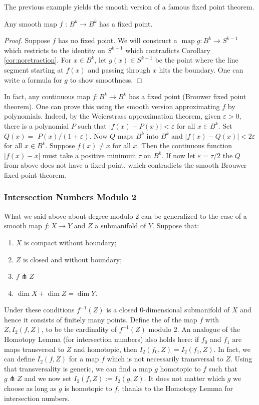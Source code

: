 \documentclass[a4paper]{scrartcl}
\begin{document}
The previous example yields the smooth version of a famous fixed point theorem.

\begin{theorem}
    Any smooth map $f$ : $B^{k} \rightarrow B^{k}$ has a fixed point.
\end{theorem}
\begin{proof}
    Suppose $f$ has no fixed point. We will construct a $\operatorname{map} g: B^{k} \rightarrow S^{k-1}$ which restricts to the identity on $S^{k-1}$ which contradicts Corollary \ref{cor:noretraction}. For $x \in B^{k}$, let $g(x) \in S^{k-1}$ be the point where the line segment starting at $f(x)$ and passing through $x$ hits the boundary. One can write a formula for $g$ to show smoothness.
\end{proof}

In fact, any continuous map $f: B^{k} \rightarrow B^{k}$ has a fixed point (Brouwer fixed point theorem). One can prove this using the smooth version approximating $f$ by polynomials. Indeed, by the Weierstrass approximation theorem, given $\varepsilon>0$, there is a polynomial $P$ such that $|f(x)-P(x)|<\varepsilon$ for all $x \in B^{k}$. Set $Q(x)=$ $P(x) /(1+\varepsilon)$. Now $Q$ maps $B^{k}$ into $B^{k}$ and $|f(x)-Q(x)|<2 \varepsilon$ for all $x \in B^{k}$. Suppose $f(x) \neq x$ for all $x$. Then the continuous function $|f(x)-x|$ must take a positive minimum $\tau$ on $B^{k}$. If now let $\varepsilon=\tau / 2$ the $Q$ from above does not have a fixed point, which contradicts the smooth Brouwer fixed point theorem.

\subsubsection{Intersection Numbers Modulo 2}

What we said above about degree modulo 2 can be generalized to the case of a smooth map $f: X \rightarrow Y$ and $Z$ a submanifold of $Y$. Suppose that:
\begin{enumerate}
    \item $X$ is compact without boundary;
    \item $Z$ is closed and without boundary;
    \item $f \pitchfork Z$
    \item $\operatorname{dim} X+\operatorname{dim} Z=\operatorname{dim} Y$.
\end{enumerate}
Under these conditions $f^{-1}(Z)$ is a closed 0-dimensional submanifold of $X$ and hence it consists of finitely many points. Define the  of the map $f$ with $Z, I_{2}(f, Z)$, to be the cardinality of $f^{-1}(Z)$ modulo 2. An analogue of the Homotopy Lemma (for intersection numbers) also holds here: if $f_{0}$ and $f_{1}$ are maps transversal to $Z$ and homotopic, then $I_{2}\left(f_{0}, Z\right)=I_{2}\left(f_{1}, Z\right)$. In fact, we can define $I_{2}(f, Z)$ for a map $f$ which is not necessarily transversal to $Z$. Using that transversality is generic, we can find a map $g$ homotopic to $f$ such that $g \pitchfork Z$ and we now set $I_{2}(f, Z):=I_{2}(g, Z)$. It does not matter which $g$ we choose as long as $g$ is homotopic to $f$, thanks to the Homotopy Lemma for intersection numbers.
\end{document}

